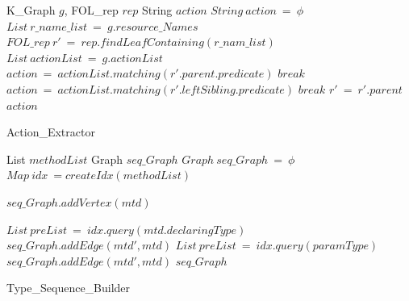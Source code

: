 \begin{algorithm}[t!]
\begin{algorithmic}[1]
\begin{scriptsize}
\REQUIRE K\_Graph $g$, FOL\_rep $rep$ 
\ENSURE String $action$
\STATE $String\ action\ =\ \phi$
\STATE $List\ r\_name\_list\ =\ g.resource\_Names$
\STATE $FOL\_rep\ r'\ =\ rep.findLeafContaining(r\_nam\_list)$
\STATE $List\ actionList\ =\ g.actionList$
		\STATE $action\ =\ actionList.matching(r'.parent.predicate)$
		\STATE $break$
	\ELSE
			\STATE $action\ =\ actionList.matching(r'.leftSibling.predicate)$
			\STATE $break$
		\ENDIF
	\ENDIF
	\STATE $r'\ =\ r'.parent$
\ENDWHILE
\RETURN $action$
\end{scriptsize}
\end{algorithmic}
\caption{Action\_Extractor}
\label{alg:SenAnnotaator}
\end{algorithm} 


\begin{algorithm}[t!]
\begin{algorithmic}[1]
\begin{scriptsize}
\REQUIRE List $methodList$ 
\ENSURE Graph $seq\_Graph$
\STATE $Graph\ seq\_Graph\ =\ \phi$
\STATE $Map\ idx\ = createIdx(methodList)$

	\STATE $seq\_Graph.addVertex(mtd)$
\ENDFOR

			\STATE $List\ preList\ =\ idx.query(mtd.declaringType)$
				\STATE $seq\_Graph.addEdge(mtd',mtd)$
			\ENDFOR
		\ENDIF
				\STATE $List\ preList\ =\ idx.query(paramType)$
					\STATE $seq\_Graph.addEdge(mtd',mtd)$
				\ENDFOR				
			\ENDIF
		\ENDFOR
	\ENDIF
\ENDFOR
\RETURN $seq\_Graph$
\end{scriptsize}
\end{algorithmic}
\caption{Type\_Sequence\_Builder}
\label{alg:SeqAnnotaator}
\end{algorithm} 



